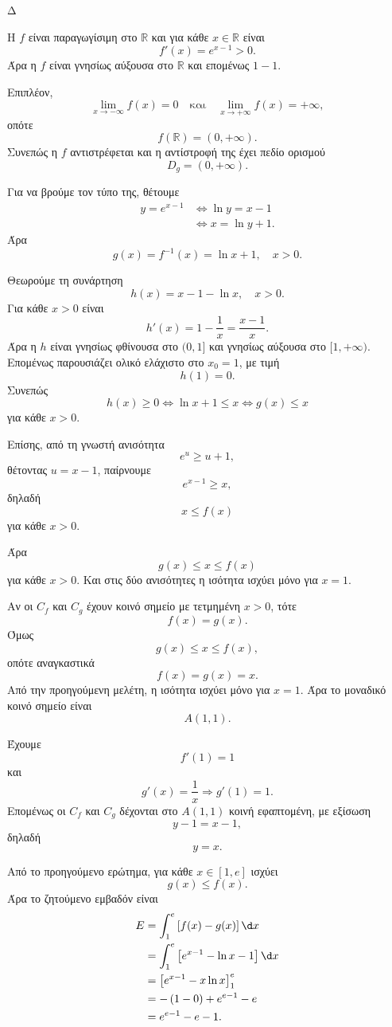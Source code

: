 \begin{thema}{Δ}
\begin{erwthma}
\item Η $f$ είναι παραγωγίσιμη στο $\mathbb{R}$ και για κάθε $x\in\mathbb{R}$ είναι
\[
f'(x)=e^{x-1}>0.
\]
Άρα η $f$ είναι γνησίως αύξουσα στο $\mathbb{R}$ και επομένως $1-1$.

Επιπλέον,
\[
\lim_{x\to-\infty}f(x)=0
\quad\text{και}\quad
\lim_{x\to+\infty}f(x)=+\infty,
\]
οπότε
\[
f(\mathbb{R})=(0,+\infty).
\]
Συνεπώς η $f$ αντιστρέφεται και η αντίστροφή της έχει πεδίο ορισμού
\[
D_g=(0,+\infty).
\]

Για να βρούμε τον τύπο της, θέτουμε
\begin{align*}
y=e^{x-1}
&\Leftrightarrow \ln y=x-1\\
&\Leftrightarrow x=\ln y+1.
\end{align*}
Άρα
\[
{g(x)=f^{-1}(x)=\ln x+1},\quad x>0.
\]

\item Θεωρούμε τη συνάρτηση
\[
h(x)=x-1-\ln x,\quad x>0.
\]
Για κάθε $x>0$ είναι
\[
h'(x)=1-\frac{1}{x}=\frac{x-1}{x}.
\]
Άρα η $h$ είναι γνησίως φθίνουσα στο $(0,1]$ και γνησίως αύξουσα στο $[1,+\infty)$. Επομένως παρουσιάζει ολικό ελάχιστο στο $x_0=1$, με τιμή
\[
h(1)=0.
\]
Συνεπώς
\[
h(x)\geq0
\Leftrightarrow
\ln x+1\leq x
\Leftrightarrow
{g(x)\leq x}
\]
για κάθε $x>0$.

Επίσης, από τη γνωστή ανισότητα
\[
e^u\geq u+1,
\]
θέτοντας $u=x-1$, παίρνουμε
\[
e^{x-1}\geq x,
\]
δηλαδή
\[
{x\leq f(x)}
\]
για κάθε $x>0$.

Άρα
\[
{g(x)\leq x\leq f(x)}
\]
για κάθε $x>0$. Και στις δύο ανισότητες η ισότητα ισχύει μόνο για $x=1$.

Αν οι $C_f$ και $C_g$ έχουν κοινό σημείο με τετμημένη $x>0$, τότε
\[
f(x)=g(x).
\]
Όμως
\[
g(x)\leq x\leq f(x),
\]
οπότε αναγκαστικά
\[
f(x)=g(x)=x.
\]
Από την προηγούμενη μελέτη, η ισότητα ισχύει μόνο για $x=1$. Άρα το μοναδικό κοινό σημείο είναι
\[
{A(1,1)}.
\]

Έχουμε
\[
f'(1)=1
\]
και
\[
g'(x)=\frac{1}{x}
\Rightarrow
g'(1)=1.
\]
Επομένως οι $C_f$ και $C_g$ δέχονται στο $A(1,1)$ κοινή εφαπτομένη, με εξίσωση
\[
y-1=x-1,
\]
δηλαδή
\[
{y=x}.
\]

\item Από το προηγούμενο ερώτημα, για κάθε $x\in[1,e]$ ισχύει
\[
g(x)\leq f(x).
\]
Άρα το ζητούμενο εμβαδόν είναι
\begin{align*}
E
&=\int_1^e\left[f(x)-g(x)\right]\d x\\
&=\int_1^e\left[e^{x-1}-\ln x-1\right]\d x\\
&=\left[e^{x-1}-x\ln x\right]_1^e\\
&=-\left(1-0\right)+e^{e-1}-e\\
&={e^{e-1}-e-1}.
\end{align*}


\end{erwthma}
\end{thema}
